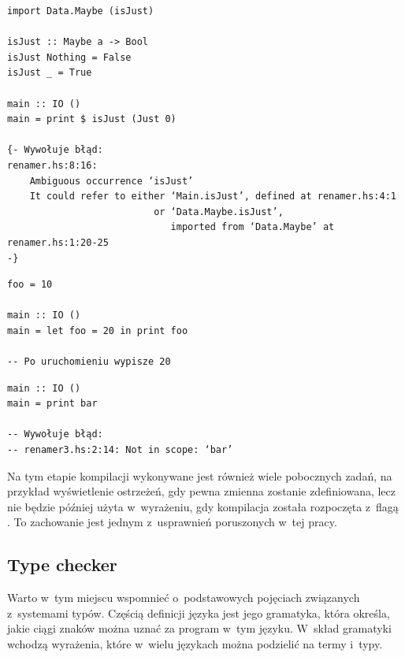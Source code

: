 \begin{lstlisting}[float,label={lst:renamer_ambiguous},
                   caption={Przykład działania renamera - niejednoznaczne odwołanie.}]
import Data.Maybe (isJust)

isJust :: Maybe a -> Bool
isJust Nothing = False
isJust _ = True

main :: IO ()
main = print $ isJust (Just 0)

{- Wywołuje błąd:
renamer.hs:8:16:
    Ambiguous occurrence ‘isJust’
    It could refer to either ‘Main.isJust’, defined at renamer.hs:4:1
                          or ‘Data.Maybe.isJust’,
                             imported from ‘Data.Maybe’ at renamer.hs:1:20-25
-}
\end{lstlisting}

\begin{lstlisting}[float,label={lst:renamer_shadowing},
                   caption={Przykład działania renamera - shadowing.}]
foo = 10

main :: IO ()
main = let foo = 20 in print foo

-- Po uruchomieniu wypisze 20
\end{lstlisting}

\begin{lstlisting}[float,label={lst:renamer_missing},
                   caption={Przykład działania renamera - nieodnalezienie w zakresie.}]
main :: IO ()
main = print bar

-- Wywołuje błąd:
-- renamer3.hs:2:14: Not in scope: ‘bar’
\end{lstlisting}

Na tym etapie kompilacji wykonywane jest również wiele pobocznych zadań, na
przykład wyświetlenie ostrzeżeń, gdy pewna zmienna zostanie zdefiniowana, lecz
nie będzie później użyta w~wyrażeniu, gdy kompilacja została rozpoczęta z~flagą
. To zachowanie jest jednym z~usprawnień poruszonych w~tej pracy.

\subsection{Type checker}\label{sec:type_checker}

Warto w~tym miejscu wspomnieć o~podstawowych pojęciach związanych z~systemami
typów. Częścią definicji języka jest jego gramatyka, która określa, jakie ciągi
znaków można uznać za program w~tym języku. W~skład gramatyki wchodzą wyrażenia,
które w~wielu językach można podzielić na termy i~typy.

